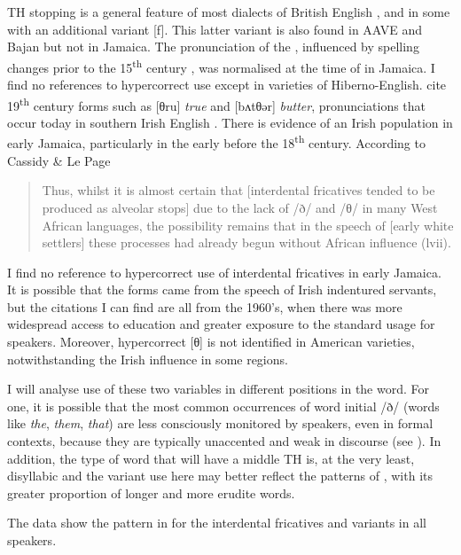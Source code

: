 TH stopping is a general feature of most dialects of British English \citep[lviii]{Cassidy1967}, and in some with an additional variant [f].  This latter variant is also found in AAVE and Bajan but not in Jamaica.  The pronunciation of the , influenced by spelling changes prior to the 15\textsuperscript{th} century \citep[168]{Pyles1993}, was normalised at the time of  in Jamaica.  I find no references to hypercorrect use except in varieties of Hiberno-English.  \citet[313]{Baugh1993} cite 19\textsuperscript{th} century forms such as [θru] \textit{true} and [bʌtθǝr] \textit{butter}, pronunciations that occur today in southern Irish English \citep[105]{ Trudgill1994}.  There is evidence of an Irish population in early Jamaica, particularly in the early  before the 18\textsuperscript{th} century.  According to Cassidy \& Le Page

\begin{quote}
	Thus, whilst it is almost certain that [interdental fricatives tended to be produced as alveolar stops] due to the lack of /ð/ and /θ/ in many West African languages, the possibility remains that in the speech of [early white settlers] these processes had already begun without African influence (lvii).
\end{quote}

I find no reference to hypercorrect use of interdental fricatives in early Jamaica.  It is possible that the forms came from the speech of Irish indentured servants, but the citations I can find are all from the 1960's, when there was more widespread access to education and greater exposure to the standard usage for speakers.   Moreover, hypercorrect [θ] is not identified in American varieties, notwithstanding the Irish influence in some regions.

I will analyse use of these two variables in different positions in the word.  For one, it is possible that the most common occurrences of word initial /ð/ (words like \textit{the}, \textit{them}, \textit{that}) are less consciously monitored by speakers, even in formal contexts, because they are typically unaccented and weak in discourse (see \citealt[185]{Gimson1980}).  In addition, the type of word that will have a middle TH is, at the very least, disyllabic and the variant use here may better reflect the patterns of , with its greater proportion of longer and more erudite words.

The data show the pattern in  for the interdental fricatives and variants in all speakers.

